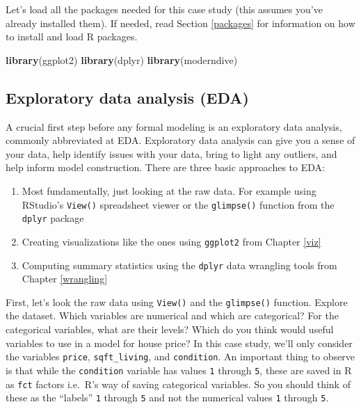 \documentclass[12pt,]{krantz}
\makeatletter
\newenvironment{Shaded}{\begin{snugshade}}{\end{snugshade}}
\newcommand{\KeywordTok}[1]{\textcolor[rgb]{0.27,0.27,0.27}{\textbf{#1}}}
\newcommand{\NormalTok}[1]{#1}
\providecommand{\tightlist}{%
  \setlength{\itemsep}{0pt}\setlength{\parskip}{0pt}}
\newenvironment{kframe}{%
\medskip{}
\setlength{\fboxsep}{.8em}
 \def\at@end@of@kframe{}%
 \ifinner\ifhmode%
  \def\at@end@of@kframe{\end{minipage}}%
  \begin{minipage}{\columnwidth}%
 \fi\fi%
 \def\FrameCommand##1{\hskip\@totalleftmargin \hskip-\fboxsep
 \colorbox{shadecolor}{##1}\hskip-\fboxsep
     \hskip-\linewidth \hskip-\@totalleftmargin \hskip\columnwidth}%
 \MakeFramed {\advance\hsize-\width
   \@totalleftmargin\z@ \linewidth\hsize
   \@setminipage}}%
 {\par\unskip\endMakeFramed%
 \at@end@of@kframe}
\renewenvironment{Shaded}{\begin{kframe}}{\end{kframe}}
\theoremstyle{definition}
\theoremstyle{definition}
\theoremstyle{definition}
\theoremstyle{remark}
\makeatother
\begin{document}
Let's load all the packages needed for this case study (this assumes
you've already installed them). If needed, read Section \ref{packages}
for information on how to install and load R packages.

\begin{Shaded}
\begin{Highlighting}[]
\KeywordTok{library}\NormalTok{(ggplot2)}
\KeywordTok{library}\NormalTok{(dplyr)}
\KeywordTok{library}\NormalTok{(moderndive)}
\end{Highlighting}
\end{Shaded}

\subsection{Exploratory data analysis (EDA)}\label{house-prices-EDA-I}

A crucial first step before any formal modeling is an exploratory data
analysis, commonly abbreviated at EDA. Exploratory data analysis can
give you a sense of your data, help identify issues with your data,
bring to light any outliers, and help inform model construction. There
are three basic approaches to EDA:

\begin{enumerate}
\def\labelenumi{\arabic{enumi}.}
\tightlist
\item
  Most fundamentally, just looking at the raw data. For example using
  RStudio's \texttt{View()} spreadsheet viewer or the \texttt{glimpse()}
  function from the \texttt{dplyr} package
\item
  Creating visualizations like the ones using \texttt{ggplot2} from
  Chapter \ref{viz}
\item
  Computing summary statistics using the \texttt{dplyr} data wrangling
  tools from Chapter \ref{wrangling}
\end{enumerate}

First, let's look the raw data using \texttt{View()} and the
\texttt{glimpse()} function. Explore the dataset. Which variables are
numerical and which are categorical? For the categorical variables, what
are their levels? Which do you think would useful variables to use in a
model for house price? In this case study, we'll only consider the
variables \texttt{price}, \texttt{sqft\_living}, and \texttt{condition}.
An important thing to observe is that while the \texttt{condition}
variable has values \texttt{1} through \texttt{5}, these are saved in R
as \texttt{fct} factors i.e.~R's way of saving categorical variables. So
you should think of these as the ``labels'' \texttt{1} through
\texttt{5} and not the numerical values \texttt{1} through \texttt{5}.
\end{document}
